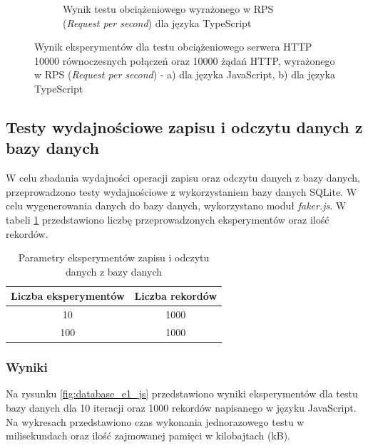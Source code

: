 \begin{figure}[H]
\begin{subfigure}[b]{0.42\textwidth}
    \caption{Wynik testu obciążeniowego wyrażonego w RPS (\textit{Request per second}) dla języka TypeScript}
    \label{fig:server_e3_ts}
  \end{subfigure}
  \caption{Wynik eksperymentów dla testu obciążeniowego serwera HTTP 10000 równoczesnych połączeń oraz 10000 żądań HTTP, wyrażonego w RPS (\textit{Request per second}) - a) dla języka JavaScript, b) dla języka TypeScript}
  \label{fig:server_e3}
\end{figure}

\subsection{Testy wydajnościowe zapisu i odczytu danych z bazy danych}
W celu zbadania wydajności operacji zapisu oraz odczytu danych z bazy danych, przeprowadzono testy wydajnościowe z wykorzystaniem bazy danych SQLite. W celu wygenerowania danych do bazy danych, wykorzystano moduł \textit{faker.js}. W tabeli \ref{tab:database_experiments} przedstawiono liczbę przeprowadzonych eksperymentów oraz ilość rekordów.

\begin{table}[H]
  \centering
  \caption{Parametry eksperymentów zapisu i odczytu danych z bazy danych}
  \begin{tabular}{|c|c|}
    \hline
    \textbf{Liczba eksperymentów} & \textbf{Liczba rekordów}\\ \hline
    10 & 1000 \\ \hline
    100 & 1000 \\ \hline
  \end{tabular}
  \label{tab:database_experiments}
\end{table}

\subsubsection{Wyniki}
Na rysunku \ref{fig:database_e1_js} przedstawiono wyniki eksperymentów dla testu bazy danych dla 10 iteracji oraz 1000 rekordów napisanego w języku JavaScript. Na wykresach przedstawiono czas wykonania jednorazowego testu w milisekundach oraz ilość zajmowanej pamięci w kilobajtach (kB).

